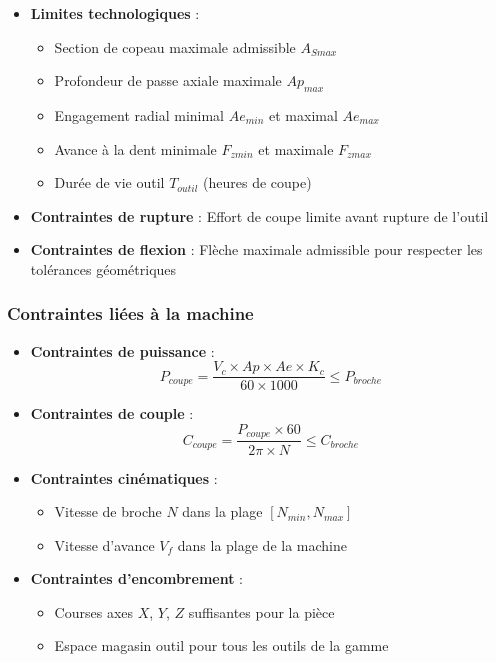 \documentclass{article}
\begin{document}
\begin{itemize}
    \item \textbf{Limites technologiques} :
    \begin{itemize}
        \item Section de copeau maximale admissible $A_{Smax}$
        \item Profondeur de passe axiale maximale $Ap_{max}$
        \item Engagement radial minimal $Ae_{min}$ et maximal $Ae_{max}$
        \item Avance à la dent minimale $F_{zmin}$ et maximale $F_{zmax}$
        \item Durée de vie outil $T_{outil}$ (heures de coupe)
    \end{itemize}
    \item \textbf{Contraintes de rupture} : Effort de coupe limite avant rupture de l'outil
    \item \textbf{Contraintes de flexion} : Flèche maximale admissible pour respecter les tolérances géométriques
\end{itemize}

\subsubsection{Contraintes liées à la machine}

\begin{itemize}
    \item \textbf{Contraintes de puissance} :
    \[
    P_{coupe} = \frac{V_c \times Ap \times Ae \times K_c}{60 \times 1000} \leq P_{broche}
    \]
    
    \item \textbf{Contraintes de couple} :
    \[
    C_{coupe} = \frac{P_{coupe} \times 60}{2\pi \times N} \leq C_{broche}
    \]
    
    \item \textbf{Contraintes cinématiques} :
    \begin{itemize}
        \item Vitesse de broche $N$ dans la plage $[N_{min}, N_{max}]$
        \item Vitesse d'avance $V_f$ dans la plage de la machine
    \end{itemize}
    
    \item \textbf{Contraintes d'encombrement} :
    \begin{itemize}
        \item Courses axes $X$, $Y$, $Z$ suffisantes pour la pièce
        \item Espace magasin outil pour tous les outils de la gamme
    \end{itemize}
\end{itemize}
\end{document}
